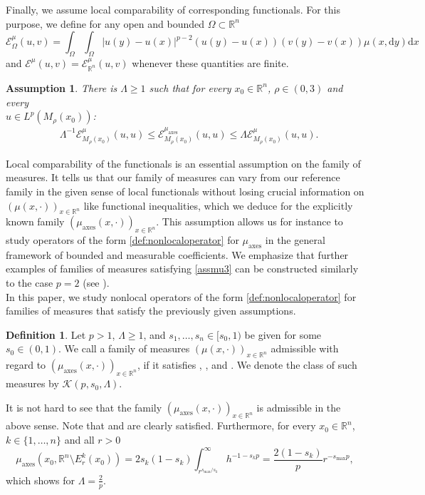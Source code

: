 \documentclass[11pt]{amsart}
\theoremstyle{plain}
\newtheorem{assumption}{Assumption}
\theoremstyle{definition}
\newtheorem{definition}[theorem]{Definition}
\numberwithin{equation}{section}
\newcommand{\R}{\mathbb{R}}
\newcommand{\ma}{\mu_{\mathrm{axes}}}
\newcommand{\cE}{\mathcal{E}}
\newcommand{\cK}{\mathcal{K}}
\begin{document}
Finally, we assume local comparability of corresponding functionals. 
For this purpose, we define for any open and bounded $\Omega\subset \R^n$ 
 \begin{equation*}
\mathcal{E}_\Omega^{\mu}(u,v) = \int_\Omega \int_\Omega |u(y) - u(x)|^{p-2}(u(y)-u(x))(v(y)-v(x)) \mu(x, \mathrm{d}y) \mathrm{d}x
\end{equation*}
and $\cE^{\mu}(u,v)=\cE_{\R^n}^{\mu}(u,v)$ whenever these quantities are finite.
\begin{assumption}\label{assumption:comparability}
There is $\Lambda\geq 1$ such that for every $x_0 \in \R^n$, $\rho \in (0,3)$ and every \\
$u \in L^p(M_{\rho}(x_0))$:
\begin{align}
\label{assmu3}
& \Lambda^{-1} \cE^{\mu}_{M_{\rho}(x_0)}(u,u) \le \cE^{\ma}_{M_{\rho}(x_0)}(u,u) \le \Lambda \cE^{\mu}_{M_{\rho}(x_0)}(u,u).
\end{align}
\end{assumption}
Local comparability of the functionals is an essential assumption on the family of measures. It tells us that our family of measures can vary from our reference family in the given sense of local functionals without losing
crucial information on $(\mu(x,\cdot))_{x\in\R^n}$ like functional inequalities, which we deduce for the explicitly known family $(\ma(x,\cdot))_{x\in\R^n}$. This assumption allows us for instance to study operators of the form \eqref{def:nonlocaloperator} for $\ma$ in the general framework of bounded and measurable coefficients. We emphasize that further examples of families of measures satisfying \eqref{assmu3} can be constructed similarly to the case $p=2$ (see \cite[Section 9]{CKW19}).\\
In this paper, we study nonlocal operators of the form \eqref{def:nonlocaloperator} for families of measures that satisfy the previously given assumptions.
\begin{definition}\label{def:admissible}
Let $p> 1$, $\Lambda \ge 1$, and $s_1,\dots,s_n\in[s_0,1)$ be given for some $s_0\in(0,1)$.
We call a family of measures $(\mu(x,\cdot))_{x\in\R^n}$ admissible with regard to $(\ma(x,\cdot))_{x\in\R^n}$,
if it satisfies , , and . We denote the class of such measures by $\cK(p,s_0,\Lambda)$.
\end{definition}
It is not hard to see that the family $(\ma(x,\cdot))_{x\in\R^n}$ is admissible in the above sense. Note that  and  are clearly satisfied. Furthermore, for every $x_0 \in \R^n$, $k \in \lbrace 1, \dots , n \rbrace$ and all $r>0$
\[ \ma(x_0, \R^n \setminus E_{r}^k(x_0)) = 2s_k(1-s_k) \int_{r^{s_{\max}/s_k}}^{\infty} h^{-1-s_kp} = \frac{2(1-s_k)}{p}r^{-s_{\max}p}, \]
which shows  for $\Lambda=\frac{2}{p}.$
\end{document}
